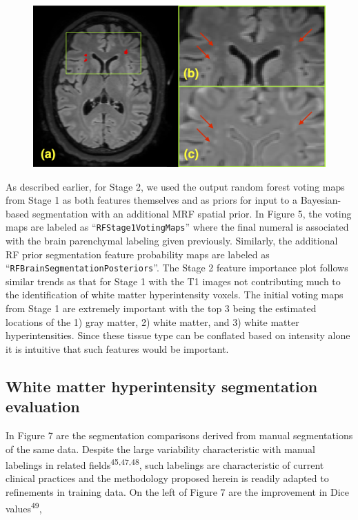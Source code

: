 \documentclass[11pt,]{article}
\begin{document}
\begin{figure}[htbp]
\centering
\includegraphics{Figures/FLAIRcontralaleteralWithLesionsAlternate.png}
\caption{}
\end{figure}

As described earlier, for Stage 2, we used the output random forest
voting maps from Stage 1 as both features themselves and as priors for
input to a Bayesian-based segmentation with an additional MRF spatial
prior. In Figure 5, the voting maps are labeled as
``\texttt{RFStage1VotingMaps}'' where the final numeral is associated
with the brain parenchymal labeling given previously. Similarly, the
additional RF prior segmentation feature probability maps are labeled as
``\texttt{RFBrainSegmentationPosteriors}''. The Stage 2 feature
importance plot follows similar trends as that for Stage 1 with the T1
images not contributing much to the identification of white matter
hyperintensity voxels. The initial voting maps from Stage 1 are
extremely important with the top 3 being the estimated locations of the
1) gray matter, 2) white matter, and 3) white matter hyperintensities.
Since these tissue type can be conflated based on intensity alone it is
intuitive that such features would be important.

\subsection{White matter hyperintensity segmentation
evaluation}\label{white-matter-hyperintensity-segmentation-evaluation}

In Figure 7 are the segmentation comparisons derived from manual
segmentations of the same data. Despite the large variability
characteristic with manual labelings in related
fields\textsuperscript{45,47,48}, such labelings are characteristic of
current clinical practices and the methodology proposed herein is
readily adapted to refinements in training data. On the left of Figure 7
are the improvement in Dice values\textsuperscript{49},
\end{document}
